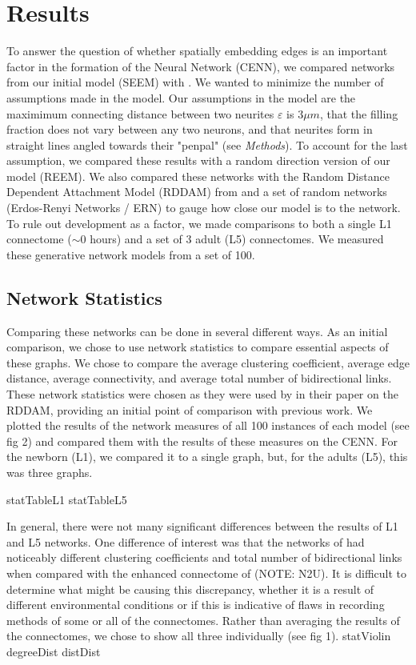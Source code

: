 \section{Results}

To answer the question of whether spatially embedding edges is an important factor in the formation of the \ce Neural Network (CENN), we compared networks from our initial model (SEEM) with \ce. 
We wanted to minimize the number of assumptions made in the model. 
Our assumptions in the model are the maximimum connecting distance between two neurites $\varepsilon$ is $3 \mu m$, that the filling fraction does not vary between any two neurons, and that neurites form in straight lines angled towards their "penpal" (see \textit{Methods}).
To account for the last assumption, we compared these results with a random direction version of our model (REEM). 
We also compared these networks with the Random Distance Dependent Attachment Model (RDDAM) from \cite{Itzhack} and a set of random networks (Erdos-Renyi Networks / ERN) to gauge how close our model is to the \ce network. 
To rule out development as a factor, we made comparisons to both a single L1 connectome ($\sim 0$ hours) and a set of 3 adult (L5) connectomes. 
We measured these generative network models from a set of 100.

\subsection{Network Statistics}
Comparing these networks can be done in several different ways. As an initial comparison, we chose to use network statistics to compare essential aspects of these graphs. We chose to compare the average clustering coefficient, average edge distance, average connectivity, and average total number of bidirectional links. These network statistics were chosen as they were used by \cite{Itzhack} in their paper on the RDDAM, providing an initial point of comparison with previous work. We plotted the results of the network measures of all 100 instances of each model (see fig 2) and compared them with the results of these measures on the CENN. For the newborn (L1), we compared it to a single graph, but, for the adults (L5), this was three graphs.

{statTableL1}
{statTableL5}  

In general, there were not many significant differences between the results of L1 and L5 networks. One difference of interest was that the networks of \cite{Witvliet} had noticeably different clustering coefficients and total number of bidirectional links when compared with the enhanced connectome of \cite{White} (NOTE: N2U).
It is difficult to determine what might be causing this discrepancy, whether it is a result of different environmental conditions or if this is indicative of flaws in recording methods of some or all of the connectomes. Rather than averaging the results of the connectomes, we chose to show all three individually (see fig 1). 
{statViolin}
{degreeDist}
{distDist}

